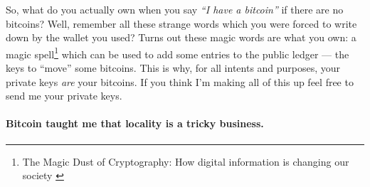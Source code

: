 So, what do you actually own when you say \textit{\enquote{I have a bitcoin}} if
there are no bitcoins? Well, remember all these strange words which you were
forced to write down by the wallet you used? Turns out these magic words are
what you own: a magic spell\footnote{The Magic Dust of Cryptography: How digital
information is changing our society \cite{gigi:magic-spell}} which can be used
to add some entries to the public ledger --- the keys to \enquote{move} some bitcoins.
This is why, for all intents and purposes, your private keys \textit{are} your
bitcoins. If you think I'm making all of this up feel free to send me your
private keys.

\paragraph{Bitcoin taught me that locality is a tricky business.}

%
%
%
%
%
%
%
